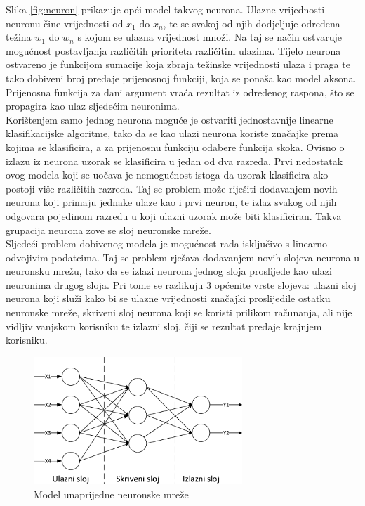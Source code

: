 \documentclass[times, utf8, zavrsni, numeric]{fer}
\begin{document}
Slika \ref{fig:neuron} prikazuje opći model takvog neurona. 
Ulazne vrijednosti neuronu čine vrijednosti od $x_1$ do $x_n$, te se svakoj od njih dodjeljuje određena težina $w_1$ do $w_n$ s kojom se ulazna vrijednost množi.
Na taj se način ostvaruje mogućnost postavljanja različitih prioriteta različitim ulazima.
Tijelo neurona ostvareno je funkcijom sumacije koja zbraja težinske vrijednosti ulaza i praga te tako dobiveni broj predaje prijenosnoj funkciji, koja se ponaša kao model aksona.
Prijenosna funkcija za dani argument vraća rezultat iz određenog raspona, što se propagira kao ulaz sljedećim neuronima.\\

Korištenjem samo jednog neurona moguće je ostvariti jednostavnije linearne klasifikacijske algoritme, tako da se kao ulazi neurona koriste značajke prema kojima se klasificira, a za prijenosnu funkciju odabere funkcija skoka.
Ovisno o izlazu iz neurona uzorak se klasificira u jedan od dva razreda.
Prvi nedostatak ovog modela koji se uočava je nemogućnost istoga da uzorak klasificira ako postoji više različitih razreda.
Taj se problem može riješiti dodavanjem novih neurona koji primaju jednake ulaze kao i prvi neuron, te izlaz svakog od njih odgovara pojedinom razredu u koji ulazni uzorak može biti klasificiran.
Takva grupacija neurona zove se sloj neuronske mreže.\\

Sljedeći problem dobivenog modela je mogućnost rada isključivo s linearno odvojivim podatcima. 
Taj se problem rješava dodavanjem novih slojeva neurona u neuronsku mrežu, tako da se izlazi neurona jednog sloja proslijede kao ulazi neuronima drugog sloja.
Pri tome se razlikuju $3$ općenite vrste slojeva: ulazni sloj neurona koji služi kako bi se ulazne vrijednosti značajki proslijedile ostatku neuronske mreže, skriveni sloj neurona koji se koristi prilikom računanja, ali nije vidljiv vanjskom korisniku te izlazni sloj, čiji se rezultat predaje krajnjem korisniku.

\begin{figure}[ht!]
    \centering
    \includegraphics[width=0.7\textwidth]{Images/FFANN.pdf}
    \captionsetup{justification=centering}
    \caption{Model unaprijedne neuronske mreže}
    \label{fig:ffann}
\end{figure}
\end{document}
